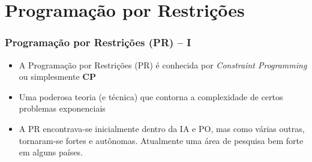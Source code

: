 
       
\section{Programação por Restrições}

\begin{frame}[fragile]

    \frametitle{Programação por Restrições (PR) -- I}

   \begin{block}{}
     \begin{itemize}
     
      \item A Programação por Restrições (PR) é conhecida por \textit{Constraint Programming} ou simplesmente \textbf{CP}

      \pause
      \item Uma poderosa teoria (e técnica)  que  contorna a complexidade de certos problemas
      exponenciais
      
       
      \pause
      \item A PR encontrava-se inicialmente dentro da IA e PO, mas como várias outras, tornaram-se
      fortes e autônomas. Atualmente uma área de pesquisa bem forte em alguns países.
      
     
    \end{itemize}
    
    \end{block}
    
\end{frame}




